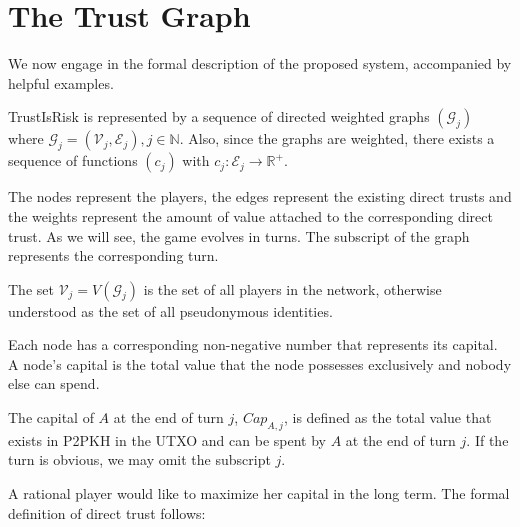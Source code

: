 \documentclass[11pt]{llncs}
\theoremstyle{definition}
\begin{document}
  \section{The Trust Graph}
     We now engage in the formal description of the proposed system, accompanied by helpful examples.
     \begin{definition}[Graph]
        TrustIsRisk is represented by a sequence of directed weighted graphs $\left(\mathcal{G}_j\right)$ where $\mathcal{G}_j
        = \left(\mathcal{V}_j, \mathcal{E}_j\right), j \in \mathbb{N}$.
        Also, since the graphs are weighted, there exists a sequence of functions $\left(c_j\right)$ with $c_j : \mathcal{E}_j
        \rightarrow \mathbb{R}^{+}$.
     \end{definition}
     The nodes represent the players, the edges represent the existing direct trusts and the weights represent the amount of
     value attached to the corresponding direct trust. As we will see, the game evolves in turns. The subscript of the graph
     represents the corresponding turn.
     \begin{definition}[Players]
        The set $\mathcal{V}_j = V\left(\mathcal{G}_j\right)$ is the set of all players in the network, otherwise understood
        as the set of all pseudonymous identities.
     \end{definition}
     Each node has a corresponding non-negative number that represents its capital. A node's capital is the total value that
     the node possesses exclusively and nobody else can spend.
     \begin{definition}[Capital]
        The capital of $A$ at the end of turn $j$, $Cap_{A, j}$, is defined as the total value that exists in P2PKH in the
        UTXO and can be spent by $A$ at the end of turn $j$. If the turn is obvious, we may omit the subscript $j$.
     \end{definition}
     A rational player would like to maximize her capital in the long term. The formal definition of direct trust follows:
\end{document}
